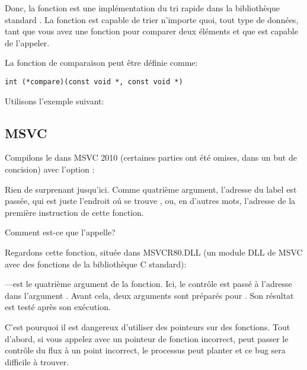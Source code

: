 
Donc, la fonction \qsort est une implémentation du tri rapide dans la bibliothèque
standard \CCpp.
La fonction est capable de trier n'importe quoi, tout type de données, tant que vous
avez une fonction pour comparer deux éléments et que \qsort est capable de l'appeler.

La fonction de comparaison peut être définie comme:

\begin{lstlisting}
int (*compare)(const void *, const void *)
\end{lstlisting}

Utilisons l'exemple suivant:



\subsection{MSVC}

Compilons le dans MSVC 2010 (certaines parties ont été omises, dans un but de concision)
avec l'option \TT{\Ox}:



Rien de surprenant jusqu'ici.
Comme quatrième argument, l'adresse du label  est passée, qui est juste
l'endroit oú se trouve \comp, ou, en d'autres mots, l'adresse de la première instruction
de cette fonction.

Comment est-ce que \qsort l'appelle?


Regardons cette fonction, située dans MSVCR80.DLL (un module DLL de MSVC avec des
fonctions de la bibliothèque C standard):



---est le quatrième argument de la fonction.
Ici, le contrôle est passé à l'adresse dans l'argument .
Avant cela, deux arguments sont préparés pour \comp. Son résultat est testé après
son exécution.

C'est pourquoi il est dangereux d'utiliser des pointeurs sur des fonctions.
Tout d'abord, si vous appelez \qsort avec un pointeur de fonction incorrect, \qsort
peut passer le contrôle du flux à un point incorrect, le processus peut planter et
ce bug sera difficile à trouver.

